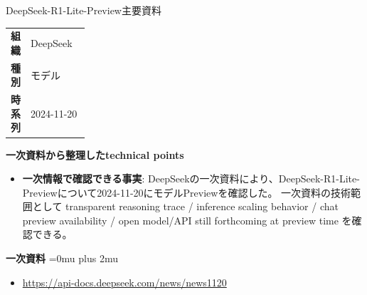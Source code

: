 \begin{technicalnote}{DeepSeek-R1-Lite-Preview}{主要資料}
\begingroup
\begin{tabularx}{\linewidth}{@{}>{\bfseries}p{0.22\linewidth}X@{}}
組織 & DeepSeek \\
種別 & モデル \\
時系列 & 2024-11-20 \\
\end{tabularx}
\smallskip
{\bfseries 一次資料から整理したtechnical points}
\begin{itemize}[leftmargin=1.5em,itemsep=0.35em]
\item \textbf{一次情報で確認できる事実}: DeepSeekの一次資料により、DeepSeek-R1-Lite-Previewについて2024-11-20にモデルPreviewを確認した。 一次資料の技術範囲として transparent reasoning trace / inference scaling behavior / chat preview availability / open model/API still forthcoming at preview time を確認できる。
\end{itemize}
\begin{minipage}{\linewidth}
\begin{samepage}
{\bfseries 一次資料}
\begingroup\sloppy
\Urlmuskip=0mu plus 2mu\relax
\begin{itemize}[leftmargin=1.5em,itemsep=0.25em]
\item {\scriptsize\url{https://api-docs.deepseek.com/news/news1120}}
\end{itemize}
\endgroup
\end{samepage}
\end{minipage}
\endgroup
\end{technicalnote}
\medskip

